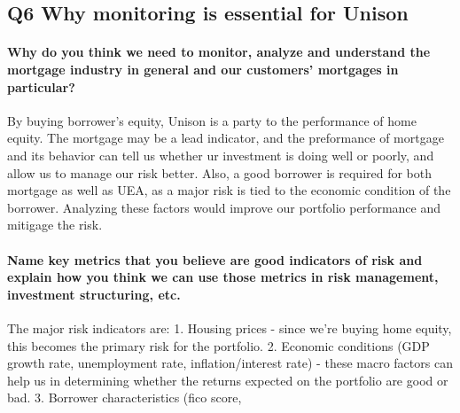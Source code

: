 \documentclass[11pt]{article}
\begin{document}
    \hypertarget{q6-why-monitoring-is-essential-for-unison}{%
\subsection{Q6 Why monitoring is essential for
Unison}\label{q6-why-monitoring-is-essential-for-unison}}

\hypertarget{why-do-you-think-we-need-to-monitor-analyze-and-understand-the-mortgage-industry-in-general-and-our-customers-mortgages-in-particular}{%
\paragraph{Why do you think we need to monitor, analyze and understand
the mortgage industry in general and our customers' mortgages in
particular?}\label{why-do-you-think-we-need-to-monitor-analyze-and-understand-the-mortgage-industry-in-general-and-our-customers-mortgages-in-particular}}

    By buying borrower's equity, Unison is a party to the performance of
home equity. The mortgage may be a lead indicator, and the preformance
of mortgage and its behavior can tell us whether ur investment is doing
well or poorly, and allow us to manage our risk better. Also, a good
borrower is required for both mortgage as well as UEA, as a major risk
is tied to the economic condition of the borrower. Analyzing these
factors would improve our portfolio performance and mitigage the risk.

    \hypertarget{name-key-metrics-that-you-believe-are-good-indicators-of-risk-and-explain-how-you-think-we-can-use-those-metrics-in-risk-management-investment-structuring-etc.}{%
\paragraph{Name key metrics that you believe are good indicators of risk
and explain how you think we can use those metrics in risk management,
investment structuring,
etc.}\label{name-key-metrics-that-you-believe-are-good-indicators-of-risk-and-explain-how-you-think-we-can-use-those-metrics-in-risk-management-investment-structuring-etc.}}

    The major risk indicators are: 1. Housing prices - since we're buying
home equity, this becomes the primary risk for the portfolio. 2.
Economic conditions (GDP growth rate, unemployment rate,
inflation/interest rate) - these macro factors can help us in
determining whether the returns expected on the portfolio are good or
bad. 3. Borrower characteristics (fico score,


    
    
    
\end{document}

